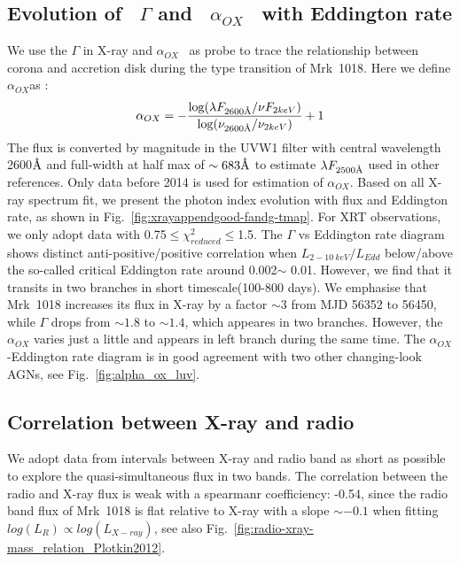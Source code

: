 \documentclass[twocolumn]{aastex63}
\newcommand{\alphaox}{$\alpha_{OX}$}
\newcommand{\angstrom}{\text{\normalfont\AA}}
\begin{document}
\subsection{Evolution of ~\texorpdfstring{$\Gamma$}. and ~\texorpdfstring{$\alpha_{OX}$}.~ with Eddington rate \label{subsec:g-f}}
We use the $\Gamma$ in X-ray and \alphaox ~ as probe to trace the relationship between corona and accretion disk during the type transition of Mrk~1018. Here we define \alphaox as :
\begin{equation}
\alpha_{OX}  = - \frac{\log(\lambda F_{2600 \angstrom}/\nu F_{2keV})}{\log(\nu_{ 2600 \angstrom }/\nu_{2keV})}+1
\end{equation}
The flux is converted by magnitude in the UVW1 filter with central wavelength {2600{$\angstrom$}} and full-width at half max of $\sim 683\angstrom$ \citep{2008MNRAS.383..627P} to estimate $\lambda F_{2500 \angstrom}$ used in other references. Only data before 2014 is used for estimation of $\alpha_{OX}$. Based on all X-ray spectrum fit, we present the photon index evolution with flux and Eddington rate, as shown in Fig.~\ref{fig:xrayappendgood-fandg-tmap}. For XRT observations, we only adopt data with 0.75$\le \chi^2_{reduced} \le$1.5. The $\Gamma$ vs Eddington rate diagram shows distinct anti-positive/positive correlation when $L_{2-10~ keV}/L_{Edd}$ below/above the so-called critical Eddington rate around 0.002$\sim$ 0.01. However, we find that it transits in two branches in short timescale(100-800 days). We emphasise that Mrk~1018 increases its flux in X-ray by a factor $\sim3$ from MJD 56352 to 56450, while $\Gamma$ drops from $\sim1.8$ to $\sim1.4$, which appeares in two branches. However, the $\alpha_{OX}$ varies just a little and appears in left branch during the same time. The $\alpha_{OX}$-Eddington rate diagram is in good agreement with two other changing-look AGNs, see Fig.~\ref{fig:alpha_ox_luv}. 





\subsection{Correlation between X-ray and radio}\label{subsec:xray-radio}
We adopt data from intervals between X-ray and radio band as short as possible to explore the quasi-simultaneous flux in two bands. The correlation between the radio and X-ray flux is weak with a spearmanr coefficiency: -0.54, since the radio band flux of Mrk~1018 is flat relative to X-ray with a slope $\sim -0.1$ when fitting $log(L_{R})\propto log(L_{X-ray})$, see also Fig.~\ref{fig:radio-xray-mass_relation_Plotkin2012}. 
\end{document}
